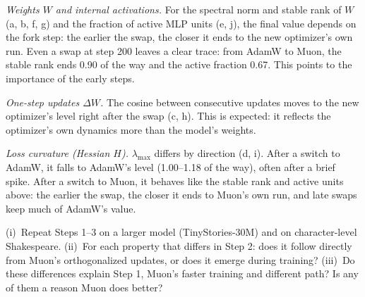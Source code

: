 \documentclass[10pt]{article}
\makeatletter
\renewcommand\paragraph{\@startsection{paragraph}{4}{\z@}{1.0ex \@plus .3ex \@minus .2ex}{-1em}{\normalfont\normalsize\bfseries}}
\makeatother
\begin{document}
\emph{Weights $W$ and internal activations.} For the spectral norm and stable rank of $W$ (a, b, f, g) and the
fraction of active MLP units (e, j), the final value depends on the fork step: the earlier the swap, the closer it ends to the new optimizer's own run. Even a
swap at step 200 leaves a clear trace: from AdamW to Muon, the stable rank ends 0.90 of the way and the active fraction 0.67. This
points to the importance of the early steps.

\emph{One-step updates $\Delta W$.} The cosine between consecutive updates moves to the new optimizer's level right
after the swap (c, h). This is expected: it reflects the optimizer's own dynamics more than the model's weights.

\emph{Loss curvature (Hessian $H$).} $\lambda_{\max}$ differs by direction (d, i). After a switch to AdamW, it
falls to AdamW's level (1.00--1.18 of the way), often after a brief spike. After a switch to Muon, it behaves like the
stable rank and active units above: the earlier the swap, the closer it ends to Muon's own run, and late swaps keep
much of AdamW's value.

\paragraph{Next steps.} (i)~Repeat Steps 1--3 on a larger model (TinyStories-30M) and on character-level Shakespeare.
(ii)~For each property that differs in Step 2: does it follow directly from Muon's orthogonalized updates, or does it
emerge during training? (iii)~Do these
differences explain Step 1, Muon's faster training and different path? Is any of them a reason Muon does better?

\clearpage
\printbibliography

\clearpage
\appendix

\end{document}
